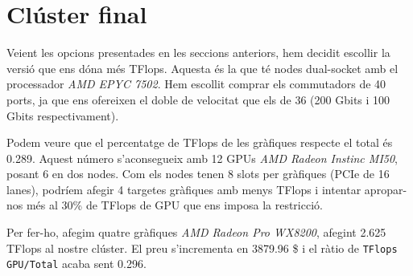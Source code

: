 \section{Clúster final}
Veient les opcions presentades en les seccions anteriors,  hem decidit escollir la versió que ens dóna més TFlops. Aquesta és la que té nodes dual-socket amb el processador \textit{AMD EPYC 7502}. Hem escollit comprar els commutadors de 40 ports, ja que ens ofereixen el doble de velocitat que els de 36 (200 Gbits i 100 Gbits respectivament).

Podem veure que el percentatge de TFlops de les gràfiques respecte el total és 0.289. Aquest número s'aconsegueix amb 12 GPUs \textit{AMD Radeon Instinc MI50}, posant 6 en dos nodes. Com els nodes tenen 8 slots per gràfiques (PCIe de 16 lanes), podríem afegir 4 targetes gràfiques amb menys TFlops i intentar apropar-nos més al 30\% de TFlops de GPU que ens imposa la restricció.

Per fer-ho, afegim quatre gràfiques \textit{AMD Radeon Pro WX8200}, afegint 2.625 TFlops al nostre clúster. El preu s'incrementa en 3879.96 \$ i el ràtio de \texttt{TFlops GPU/Total} acaba sent 0.296.

